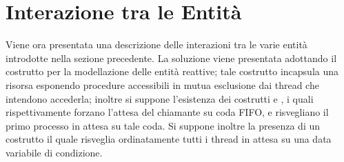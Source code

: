\section{Interazione tra le Entità}

Viene ora presentata una descrizione delle interazioni tra le varie entità introdotte nella sezione precedente. La soluzione viene presentata adottando il costrutto  per la modellazione delle entità reattive; tale costrutto incapsula una risorsa esponendo procedure accessibili in mutua esclusione dai thread che intendono accederla; inoltre si suppone l'esistenza dei costrutti  e , i quali rispettivamente forzano l'attesa del chiamante su coda FIFO, e risvegliano il primo processo in attesa su tale coda. Si suppone inoltre la presenza di un costrutto  il quale risveglia ordinatamente tutti i thread in attesa su una data variabile di condizione.






